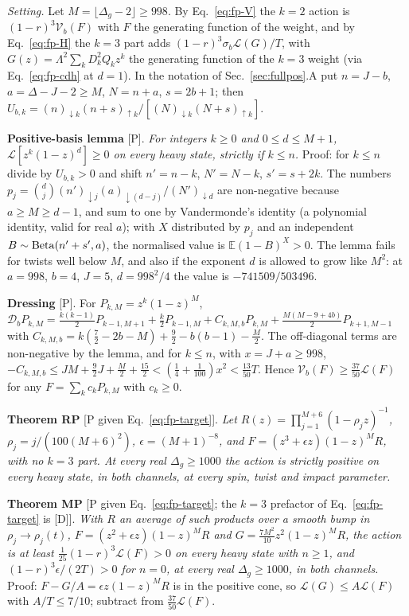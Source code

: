 \emph{Setting.} Let $M=\lfloor\Delta_g-2\rfloor\ge998$. By Eq.~\eqref{eq:fp-V} the $k=2$ action is $(1-r)^3\mathcal V_b(F)$ with $F$ the
generating function of the weight, and by Eq.~\eqref{eq:fp-H} the $k=3$ part adds $(1-r)^3\sigma_b\mathcal L(G)/T$, with
$G(z)=\Lambda^2\sum_kD_k^2Q_kz^k$ the generating function of the $k=3$ weight (via Eq.~\eqref{eq:fp-cdh} at $d=1$). In the notation of
Sec.~\ref{sec:fullpos}.A put $n=J-b$, $a=\Delta-J-2\ge M$, $N=n+a$, $s=2b+1$; then $U_{b,k}=(n)_{\downarrow k}(n+s)_{\uparrow k}/
[(N)_{\downarrow k}(N+s)_{\uparrow k}]$.

\textbf{Positive-basis lemma} [P]. \emph{For integers $k\ge0$ and $0\le d\le M+1$, $\mathcal L[z^k(1-z)^d]\ge0$ on every heavy state,
strictly if $k\le n$.} Proof: for $k\le n$ divide by $U_{b,k}>0$ and shift $n'=n-k$, $N'=N-k$, $s'=s+2k$. The numbers
$p_j=\binom dj(n')_{\downarrow j}(a)_{\downarrow(d-j)}/(N')_{\downarrow d}$ are non-negative because $a\ge M\ge d-1$, and sum to one by
Vandermonde's identity (a polynomial identity, valid for real $a$); with $X$ distributed by $p_j$ and an independent
$B\sim{\rm Beta}(n'+s',a)$, the normalised value is $\mathbb E(1-B)^X>0$. The lemma fails for twists well below $M$, and also if the
exponent $d$ is allowed to grow like $M^2$: at $a=998$, $b=4$, $J=5$, $d=998^2/4$ the value is $-741509/503496$.

\textbf{Dressing} [P]. For $P_{k,M}=z^k(1-z)^M$,
$\mathcal D_bP_{k,M}=\tfrac{k(k-1)}2P_{k-1,M+1}+\tfrac k2P_{k-1,M}+C_{k,M,b}P_{k,M}+\tfrac{M(M-9+4b)}2P_{k+1,M-1}$ with
$C_{k,M,b}=k(\tfrac72-2b-M)+\tfrac92-b(b-1)-\tfrac M2$. The off-diagonal terms are non-negative by the lemma, and for $k\le n$,
with $x=J+a\ge998$, $-C_{k,M,b}\le JM+\tfrac92J+\tfrac M2+\tfrac{15}2<(\tfrac14+\tfrac1{100})x^2<\tfrac{13}{50}T$. Hence
$\mathcal V_b(F)\ge\tfrac{37}{50}\mathcal L(F)$ for any $F=\sum_k c_kP_{k,M}$ with $c_k\ge0$.

\textbf{Theorem RP} [P given Eq.~\eqref{eq:fp-target}]. \emph{Let $R(z)=\prod_{j=1}^{M+6}(1-\rho_jz)^{-1}$, $\rho_j=j/(100(M+6)^2)$,
$\epsilon=(M+1)^{-8}$, and $F=(z^3+\epsilon z)(1-z)^MR$, with no $k=3$ part. At every real $\Delta_g\ge1000$ the action is strictly
positive on every heavy state, in both channels, at every spin, twist and impact parameter.}

\textbf{Theorem MP} [P given Eq.~\eqref{eq:fp-target}; the $k=3$ prefactor of Eq.~\eqref{eq:fp-target} is [D]]. \emph{With $R$ an average
of such products over a smooth bump in $\rho_j\to\rho_j(t)$, $F=(z^2+\epsilon z)(1-z)^MR$ and $G=\tfrac{7M^2}{10}z^2(1-z)^MR$, the action
is at least $\tfrac1{25}(1-r)^3\mathcal L(F)>0$ on every heavy state with $n\ge1$, and $(1-r)^3\epsilon/(2T)>0$ for $n=0$, at every real
$\Delta_g\ge1000$, in both channels.} Proof: $F-G/A=\epsilon z(1-z)^MR$ is in the positive cone, so $\mathcal L(G)\le A\mathcal L(F)$
with $A/T\le7/10$; subtract from $\tfrac{37}{50}\mathcal L(F)$.


